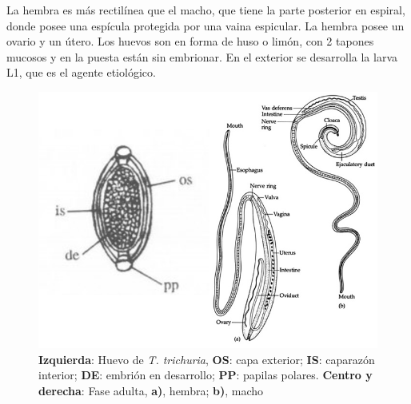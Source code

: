 La hembra es más rectilínea que el macho, que tiene la parte posterior en espiral, donde posee una espícula protegida por una vaina espicular. La hembra posee un ovario y un útero. Los huevos son en forma de huso o limón, con 2 tapones mucosos y en la puesta están sin embrionar. En el exterior se desarrolla la larva L1, que es el agente etiológico.
\begin{figure}[H]
	\centering
	\includegraphics[width=0.6\columnwidth]{A.imagenes/ACV-BioSan-Parasit-TTrichuriaMorf}
	\caption[Morfología de \textit{T. trichuria}]{\textbf{Izquierda}: Huevo de \textit{T. trichuria}, \textbf{OS}: capa exterior; \textbf{IS}: caparazón interior; \textbf{DE}: embrión en desarrollo; \textbf{PP}: papilas polares. \textbf{Centro y derecha}: Fase adulta, \textbf{a)}, hembra; \textbf{b)}, macho \label{fig:PARASIT:TTrichuriaMorf}}
\end{figure}
